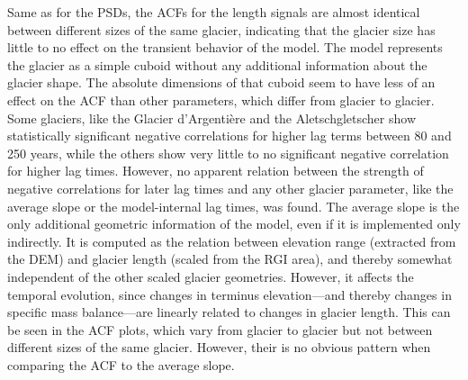       Same as for the PSDs, the ACFs for the \vas{} length signals are almost identical between different sizes of the same glacier, indicating that the glacier size has little to no effect on the transient behavior of the model. The \vas{} model represents the glacier as a simple cuboid without any additional information about the glacier shape. The absolute dimensions of that cuboid seem to have less of an effect on the ACF than other parameters, which differ from glacier to glacier. Some glaciers, like the Glacier d'Argentière and the Aletschgletscher show statistically significant negative correlations for higher lag terms between 80 and 250 years, while the others show very little to no significant negative correlation for higher lag times. However, no apparent relation between the strength of negative correlations for later lag times and any other glacier parameter, like the average slope or the model-internal lag times, was found.
      The average slope is the only additional geometric information of the \vas{} model, even if it is implemented only indirectly. It is computed as the relation between elevation range (extracted from the DEM) and glacier length (scaled from the RGI area), and thereby somewhat independent of the other scaled glacier geometries.
      However, it affects the temporal evolution, since changes in terminus elevation---and thereby changes in specific mass balance---are linearly related to changes in glacier length. This can be seen in the ACF plots, which vary from glacier to glacier but not between different sizes of the same glacier.  However, their is no obvious pattern when comparing the ACF to the average slope.
    
